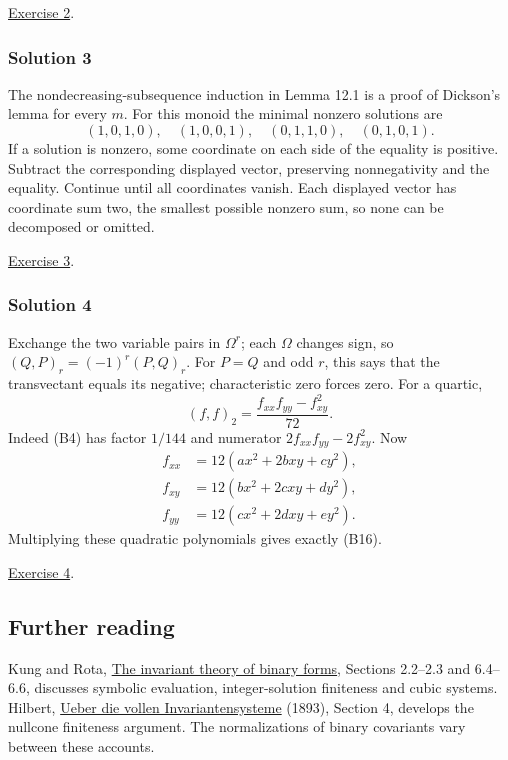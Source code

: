 \documentclass[
]{article}
\begin{document}
\hyperref[exercise-2]{Exercise 2}.

\subsubsection{Solution 3}\label{solution-3}

The nondecreasing-subsequence induction in Lemma 12.1 is a proof of
Dickson's lemma for every \(m\). For this monoid the minimal nonzero
solutions are \[
(1,0,1,0),\quad(1,0,0,1),\quad
(0,1,1,0),\quad(0,1,0,1).
\] If a solution is nonzero, some coordinate on each side of the
equality is positive. Subtract the corresponding displayed vector,
preserving nonnegativity and the equality. Continue until all
coordinates vanish. Each displayed vector has coordinate sum two, the
smallest possible nonzero sum, so none can be decomposed or omitted.

\hyperref[exercise-3]{Exercise 3}.

\subsubsection{Solution 4}\label{solution-4}

Exchange the two variable pairs in \(\Omega^r\); each \(\Omega\) changes
sign, so \((Q,P)_r=(-1)^r(P,Q)_r\). For \(P=Q\) and odd \(r\), this says
that the transvectant equals its negative; characteristic zero forces
zero. For a quartic, \[
(f,f)_2=\frac{f_{xx}f_{yy}-f_{xy}^2}{72}.
\] Indeed (B4) has factor \(1/144\) and numerator
\(2f_{xx}f_{yy}-2f_{xy}^2\). Now \[
\begin{aligned}
f_{xx}&=12(ax^2+2bxy+cy^2),\\
f_{xy}&=12(bx^2+2cxy+dy^2),\\
f_{yy}&=12(cx^2+2dxy+ey^2).
\end{aligned}
\] Multiplying these quadratic polynomials gives exactly (B16).

\hyperref[exercise-4]{Exercise 4}.

\subsection{Further reading}\label{further-reading}

Kung and Rota,
\href{https://staff.math.su.se/shapiro/ProblemSolving/Rota.pdf}{The
invariant theory of binary forms}, Sections 2.2--2.3 and 6.4--6.6,
discusses symbolic evaluation, integer-solution finiteness and cubic
systems. Hilbert,
\href{https://gdz.sub.uni-goettingen.de/id/PPN235181684_0042}{Ueber die
vollen Invariantensysteme} (1893), Section 4, develops the nullcone
finiteness argument. The normalizations of binary covariants vary
between these accounts.
\end{document}
